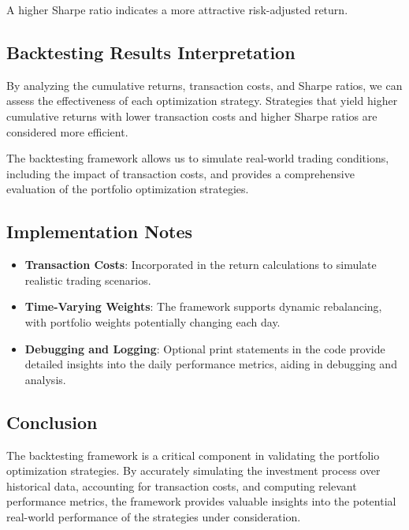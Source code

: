 A higher Sharpe ratio indicates a more attractive risk-adjusted return.

\subsection{Backtesting Results Interpretation}

By analyzing the cumulative returns, transaction costs, and Sharpe ratios, we can assess the effectiveness of each optimization strategy. Strategies that yield higher cumulative returns with lower transaction costs and higher Sharpe ratios are considered more efficient.

The backtesting framework allows us to simulate real-world trading conditions, including the impact of transaction costs, and provides a comprehensive evaluation of the portfolio optimization strategies.

\subsection{Implementation Notes}

\begin{itemize}
    \item \textbf{Transaction Costs}: Incorporated in the return calculations to simulate realistic trading scenarios.
    \item \textbf{Time-Varying Weights}: The framework supports dynamic rebalancing, with portfolio weights potentially changing each day.
    \item \textbf{Debugging and Logging}: Optional print statements in the code provide detailed insights into the daily performance metrics, aiding in debugging and analysis.
\end{itemize}

\subsection{Conclusion}

The backtesting framework is a critical component in validating the portfolio optimization strategies. By accurately simulating the investment process over historical data, accounting for transaction costs, and computing relevant performance metrics, the framework provides valuable insights into the potential real-world performance of the strategies under consideration.


